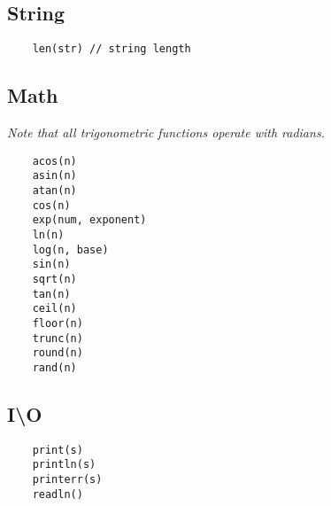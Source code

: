 \subsection{String}
\begin{verbatim}
    len(str) // string length
\end{verbatim}

\subsection{Math}
\emph{Note that all trigonometric functions operate with radians.}
\begin{verbatim}
    acos(n)
    asin(n)
    atan(n)
    cos(n)
    exp(num, exponent)
    ln(n)
    log(n, base)
    sin(n)
    sqrt(n)
    tan(n)
    ceil(n)
    floor(n)
    trunc(n)
    round(n)
    rand(n)
\end{verbatim}

\subsection{I\textbackslash O}
\begin{verbatim}
    print(s)
    println(s)
    printerr(s)
    readln()
\end{verbatim}


